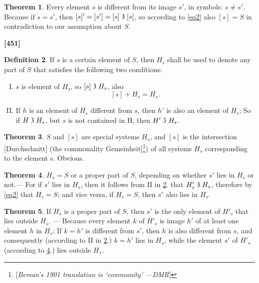 \documentclass[leqno, hidelinks]{article}
\theoremstyle{definition}
\newtheorem{theorem}{Theorem}
\newtheorem{definition}[theorem]{Definition}
\newcommand\partof{\mathrel{\raisebox{0.45ex}{$\mathfrak{3}$}}}
\begin{document}
\begin{theorem}\label{thm2}
Every element $s$ is different from its image $s'$, in symbols: $s \neq s'$.
Because if $s = s'$, then $[s]' = [s'] = [s] \partof [s]$, so according to \eqref{eq2} also $[s] = S$ in contradiction to our assumption about $S$.
\end{theorem}

\textbf{[451]}


\begin{definition}\label{def3}
If $s$ is a certain element of $S$, then $H_s$ shall be used to denote any part of $S$ that satisfies the following two conditions:
\begin{enumerate}[I.]
\item $s$ is element of $H_s$, so $[s] \partof H_s$, also
\[
	[s] + H_s = H_s.
\]
\item If $h$ is an element of $H_s$ different from $s$, then $h'$ is also an element of $H_s$; So if $H \partof H_s$, but $s$ is not contained in H, then $H' \partof H_s$.
\end{enumerate}
\end{definition}

 \begin{theorem}\label{thm4}
 $S$ and $[s]$ are special systems $H_s$, and $[s]$ is the intersection [Durchschnitt] (the commonality Gemeinheit]\footnote{[\emph{Beman's 1901 translation is `community' ---DMR}]}) of all systems $H_s$ corresponding to the element s. Obvious.\end{theorem}

\begin{theorem}\label{thm5}
$H_s = S$ or a proper part of $S$, depending on whether $s'$ lies in $H_s$ or not.--- For if $s'$ lies in $H_s$, then it follows from II in \ref{def3}. that $H'_s \partof H_s$, therefore by \eqref{eq2} that $H_s = S$; and vice versa, if $H_s = S$, then $s'$ also lies in $H_s$.\end{theorem}



\begin{theorem}\label{thm6}
 If $H_s$ is a proper part of $S$, then $s'$ is the only element of $H'_s$ that lies outside $H_s$.
--- Because every element $k$ of $H'_s$ is image $h'$ of at least one element $h$ in $H_s$;
If $k=h'$ is different from $s'$, then $h$ is also different from $s$, and consequently (according to II in \ref{def3}.) $k = h'$ lies in $H_s$, while the element $s'$ of $H'_s$ (according to \ref{thm5}.) lies outside $H_s$.
\end{theorem}
\end{document}
